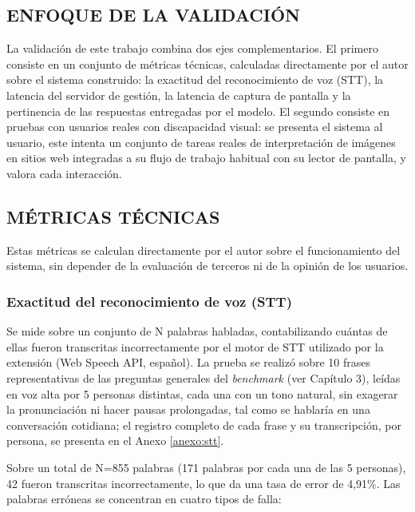 
\subsection{ENFOQUE DE LA VALIDACIÓN}

La validación de este trabajo combina dos ejes complementarios. El primero consiste en un conjunto de métricas técnicas, calculadas directamente por el autor sobre el sistema construido: la exactitud del reconocimiento de voz (STT), la latencia del servidor de gestión, la latencia de captura de pantalla y la pertinencia de las respuestas entregadas por el modelo. El segundo consiste en pruebas con usuarios reales con discapacidad visual: se presenta el sistema al usuario, este intenta un conjunto de tareas reales de interpretación de imágenes en sitios web integradas a su flujo de trabajo habitual con su lector de pantalla, y valora cada interacción.

\subsection{MÉTRICAS TÉCNICAS}

Estas métricas se calculan directamente por el autor sobre el funcionamiento del sistema, sin depender de la evaluación de terceros ni de la opinión de los usuarios.

\subsubsection{Exactitud del reconocimiento de voz (STT)}

Se mide sobre un conjunto de N palabras habladas, contabilizando cuántas de ellas fueron transcritas incorrectamente por el motor de STT utilizado por la extensión (Web Speech API, español). La prueba se realizó sobre 10 frases representativas de las preguntas generales del \textit{benchmark} (ver Capítulo 3), leídas en voz alta por 5 personas distintas, cada una con un tono natural, sin exagerar la pronunciación ni hacer pausas prolongadas, tal como se hablaría en una conversación cotidiana; el registro completo de cada frase y su transcripción, por persona, se presenta en el Anexo \ref{anexo:stt}.

Sobre un total de N=855 palabras (171 palabras por cada una de las 5 personas), 42 fueron transcritas incorrectamente, lo que da una tasa de error de 4,91\%. Las palabras erróneas se concentran en cuatro tipos de falla:

